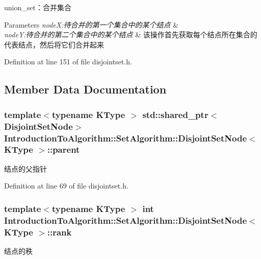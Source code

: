 union\+\_\+set：合并集合 


\begin{DoxyParams}{Parameters}
{\em node\+X\+:待合并的第一个集合中的某个结点} & \\
\hline
{\em node\+Y\+:待合并的第二个集合中的某个结点} & 该操作首先获取每个结点所在集合的代表结点，然后将它们合并起来 \\
\hline
\end{DoxyParams}


Definition at line 151 of file disjointset.\+h.



\subsection{Member Data Documentation}
\hypertarget{struct_introduction_to_algorithm_1_1_set_algorithm_1_1_disjoint_set_node_ad5cf3f4d739ecd0c1f6d3b3005e21993}{}
\subsubsection[{parent}]{\setlength{\rightskip}{0pt plus 5cm}template$<$typename K\+Type $>$ std\+::shared\+\_\+ptr$<${\bf Disjoint\+Set\+Node}$>$ {\bf Introduction\+To\+Algorithm\+::\+Set\+Algorithm\+::\+Disjoint\+Set\+Node}$<$ K\+Type $>$\+::parent}\label{struct_introduction_to_algorithm_1_1_set_algorithm_1_1_disjoint_set_node_ad5cf3f4d739ecd0c1f6d3b3005e21993}
结点的父指针 

Definition at line 69 of file disjointset.\+h.

\hypertarget{struct_introduction_to_algorithm_1_1_set_algorithm_1_1_disjoint_set_node_a1fd137f74ca1317bfb02d9e1640ce147}{}
\subsubsection[{rank}]{\setlength{\rightskip}{0pt plus 5cm}template$<$typename K\+Type $>$ int {\bf Introduction\+To\+Algorithm\+::\+Set\+Algorithm\+::\+Disjoint\+Set\+Node}$<$ K\+Type $>$\+::rank}\label{struct_introduction_to_algorithm_1_1_set_algorithm_1_1_disjoint_set_node_a1fd137f74ca1317bfb02d9e1640ce147}
结点的秩 

